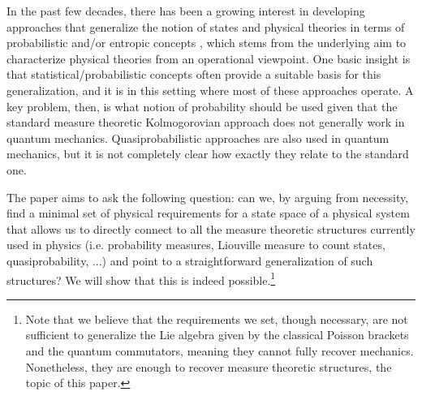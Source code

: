 \documentclass[10pt,twocolumn, nofootinbib]{revtex4-2}
\begin{document}
In the past few decades, there has been a growing interest in developing approaches that generalize the notion of states and physical theories in terms of probabilistic and/or entropic concepts \cite{plavala2023,wilce2025,ariano2017,caticha2019,hall2016}, which stems from the underlying aim to characterize physical theories from an operational viewpoint. One basic insight is that statistical/probabilistic concepts often provide a suitable basis for this generalization, and it is in this setting where most of these approaches operate. A key problem, then, is what notion of probability should be used given that the standard measure theoretic Kolmogorovian approach does not generally work in quantum mechanics\cite{chsh1969,fine1982}. Quasiprobabilistic approaches \cite{zachos2005,mandel1995,monchietti2025} are also used in quantum mechanics, but it is not completely clear how exactly they relate to the standard one.

The paper aims to ask the following question: can we, by arguing from necessity, find a minimal set of physical requirements for a state space of a physical system that allows us to directly connect to all the measure theoretic structures currently used in physics (i.e. probability measures, Liouville measure to count states, quasiprobability, ...) and point to a straightforward generalization of such structures? We will show that this is indeed possible.\footnote{Note that we believe that the requirements we set, though necessary, are not sufficient to generalize the Lie algebra given by the classical Poisson brackets and the quantum commutators, meaning they cannot fully recover mechanics. Nonetheless, they are enough to recover measure theoretic structures, the topic of this paper.}
\end{document}
